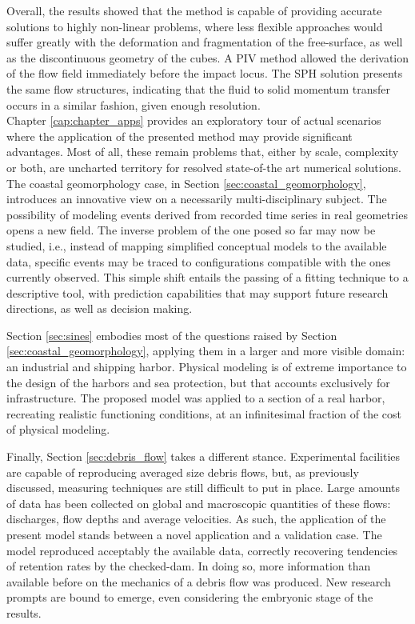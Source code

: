 Overall, the results showed that the method is capable of providing accurate solutions to highly non-linear problems, where less flexible approaches would suffer greatly with the deformation and fragmentation of the free-surface, as well as the discontinuous geometry of the cubes. A \ac{PIV} method allowed the derivation of the flow field immediately before the impact locus. The \ac{SPH} solution presents the same flow structures, indicating that the fluid to solid momentum transfer occurs in a similar fashion, given enough resolution.\\

Chapter \ref{cap:chapter_apps} provides an exploratory tour of actual scenarios where the application of the presented method may provide significant advantages. Most of all, these remain problems that, either by scale, complexity or both, are uncharted territory for resolved state-of-the art numerical solutions. The coastal geomorphology case, in Section \ref{sec:coastal_geomorphology}, introduces an innovative view on a necessarily multi-disciplinary subject. The possibility of modeling events derived from recorded time series in real geometries opens a new field. The inverse problem of the one posed so far may now be studied, i.e., instead of mapping simplified conceptual models to the available data, specific events may be traced to configurations compatible with the ones currently observed. This simple shift entails the passing of a fitting technique to a descriptive tool, with prediction capabilities that may support future research directions, as well as decision making.

Section \ref{sec:sines} embodies most of the questions raised by Section \ref{sec:coastal_geomorphology}, applying them in a larger and more visible domain: an industrial and shipping harbor. Physical modeling is of extreme importance to the design of the harbors and sea protection, but that accounts exclusively for infrastructure. The proposed model was applied to a section of a real harbor, recreating realistic functioning conditions, at an infinitesimal fraction of the cost of physical modeling. 

Finally, Section \ref{sec:debris_flow} takes a different stance. Experimental facilities are capable of reproducing averaged size debris flows, but, as previously discussed, measuring techniques are still difficult to put in place. Large amounts of data has been collected on global and macroscopic quantities of these flows: discharges, flow depths and average velocities. As such, the application of the present model stands between a novel application and a validation case. The model reproduced acceptably the available data, correctly recovering tendencies of retention rates by the checked-dam. In doing so, more information than available before on the mechanics of a debris flow was produced. New research prompts are bound to emerge, even considering the embryonic stage of the results.



